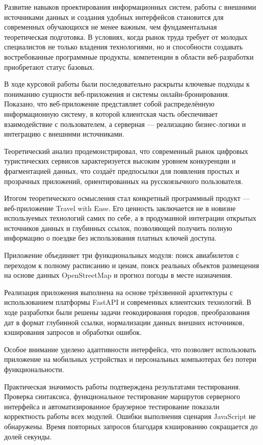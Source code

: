 \documentclass[14pt,a4paper,oneside]{extreport}
\begin{document}
Развитие навыков проектирования информационных систем, работы с внешними источниками данных и создания удобных интерфейсов становится для современных обучающихся не менее важным, чем фундаментальная теоретическая подготовка. В условиях, когда рынок труда требует от молодых специалистов не только владения технологиями, но и способности создавать востребованные программные продукты, компетенции в области веб-разработки приобретают статус базовых.

В ходе курсовой работы были последовательно раскрыты ключевые подходы к пониманию сущности веб-приложения и системы онлайн-бронирования. Показано, что веб-приложение представляет собой распределённую информационную систему, в которой клиентская часть обеспечивает взаимодействие с пользователем, а серверная — реализацию бизнес-логики и интеграцию с внешними источниками.

Теоретический анализ продемонстрировал, что современный рынок цифровых туристических сервисов характеризуется высоким уровнем конкуренции и фрагментацией данных, что создаёт предпосылки для появления простых и прозрачных приложений, ориентированных на русскоязычного пользователя.

Итогом теоретического осмысления стал конкретный программный продукт — веб-приложение Travel with Ease. Его ценность заключается не в новизне используемых технологий самих по себе, а в продуманной интеграции открытых источников данных и глубинных ссылок, позволяющей получить полную информацию о поездке без использования платных ключей доступа.

Приложение объединяет три функциональных модуля: поиск авиабилетов с переходом к полному расписанию и ценам, поиск реальных объектов размещения на основе данных OpenStreetMap и прогноз погоды в месте назначения.

Реализация приложения выполнена на основе трёхзвенной архитектуры с использованием платформы FastAPI и современных клиентских технологий. В ходе разработки были решены задачи геокодирования городов, преобразования дат в формат глубинной ссылки, нормализации данных внешних источников, кэширования запросов и обработки ошибок.

Особое внимание уделено адаптивности интерфейса, что позволяет использовать приложение на мобильных устройствах и персональных компьютерах без потери функциональности.

Практическая значимость работы подтверждена результатами тестирования. Проверка синтаксиса, функциональное тестирование маршрутов серверного интерфейса и автоматизированное браузерное тестирование показали корректность работы всех модулей. Ошибки выполнения сценария JavaScript не обнаружены. Время повторных запросов благодаря кэшированию сокращается до долей секунды.
\end{document}
